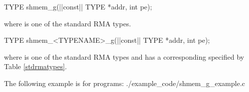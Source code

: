 
\begin{apidefinition}

\begin{C11synopsis}
TYPE shmem_g(|\aftergroup{}|const|\aftergroup\prevcolor| TYPE *addr, int pe);
\end{C11synopsis}
where \TYPE{} is one of the standard \ac{RMA} types.

\begin{Csynopsis}
TYPE shmem_<TYPENAME>_g(|\aftergroup{}|const|\aftergroup\prevcolor| TYPE *addr, int pe);
\end{Csynopsis}
where \TYPE{} is one of the standard \ac{RMA} types and has a corresponding \TYPENAME{} specified by Table \ref{stdrmatypes}.



\begin{apiarguments}
\end{apiarguments}




\begin{apiexamples}

\apicexample
    {The following  example is for \CorCpp{} programs:}
    {./example_code/shmem_g_example.c}
    {}
\end{apiexamples}

\end{apidefinition}
